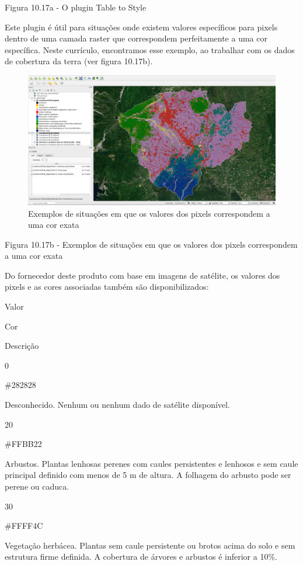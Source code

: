 \documentclass[
]{krantz}
\begin{document}
Figura 10.17a - O plugin Table to Style

Este plugin é útil para situações onde existem valores específicos para pixels dentro de uma camada raster que correspondem perfeitamente a uma cor específica. Neste currículo, encontramos esse exemplo, ao trabalhar com os dados de cobertura da terra (ver figura 10.17b).

\begin{figure}
\centering
\includegraphics{media/modulo10/fig1017_b.png}
\caption{Exemplos de situações em que os valores dos pixels correspondem a uma cor exata}
\end{figure}

Figura 10.17b - Exemplos de situações em que os valores dos pixels correspondem a uma cor exata

Do fornecedor deste produto com base em imagens de satélite, os valores dos pixels e as cores associadas também são disponibilizados:

Valor

Cor

Descrição

0

\#282828

Desconhecido. Nenhum ou nenhum dado de satélite disponível.

20

\#FFBB22

Arbustos. Plantas lenhosas perenes com caules persistentes e lenhosos e sem caule principal definido com menos de 5 m de altura. A folhagem do arbusto pode ser perene ou caduca.

30

\#FFFF4C

Vegetação herbácea. Plantas sem caule persistente ou brotos acima do solo e sem estrutura firme definida. A cobertura de árvores e arbustos é inferior a 10\%.
\end{document}
